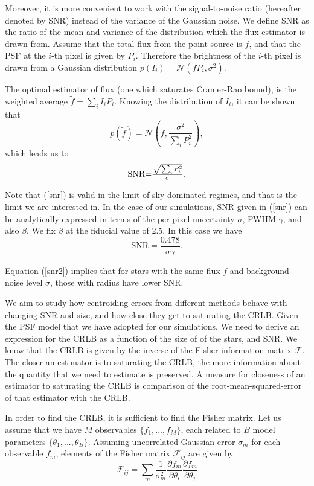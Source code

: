 \documentclass[12pt, preprint]{aastex}
\newcommand{\beq}{\begin{equation}}
\newcommand{\eeq}{\end{equation}}
\begin{document}
Moreover, it is more convenient to work with the signal-to-noise ratio
(hereafter denoted by SNR) instead of the variance of the Gaussian noise.
We define SNR as the ratio of the mean and variance of the distribution
which the flux estimator is drawn from. Assume that the total flux from
the point source is $f$, and that the PSF at the $i$-th pixel is given
by $P_{i}$. Therefore the brightness of the $i$-th pixel is drawn from
a Gaussian distribution $p(I_{i}) = \mathcal{N}(fP_{i},\sigma^{2})$. 

The optimal estimator of flux (one which saturates Cramer-Rao bound),
is the weighted average $\tilde{f}=\sum_{i}I_{i}P_{i}$. Knowing the
distribution of $I_{i}$, it can be shown that 
\beq
p(\tilde{f}) = \mathcal{N}(f , \frac{\sigma^{2}}{\sum_{i}P_{i}^{2}}),
\eeq  
which leads us to
\beq
\begin{array}{l}
\text{SNR} $=$ \frac{\sqrt{\sum_{i} P_{i}^{2}}}{\sigma}.
\end{array}
\label{snr}
\eeq

Note that (\ref{snr}) is valid in the limit of sky-dominated regimes,
and that is the limit we are interested in. In the case of our simulations,
SNR given in (\ref{snr}) can be analytically expressed in terms of the per pixel uncertainty
$\sigma$, FWHM $\gamma$, and also $\beta$. We fix $\beta$ at the fiducial value of 2.5.
In this case we have
\beq
\text{SNR} = \frac{0.478}{\sigma \gamma}.
\label{snr2}
\eeq

Equation (\ref{snr2}) implies that for stars with the same flux $f$ and background
noise level $\sigma$, those with radius have lower SNR.

We aim to study how centroiding errors from different methods behave with
changing SNR and size, and how close they get to saturating the CRLB. 
Given the PSF model that we have adopted for our simulations, We need 
to derive an expression for the CRLB as a function of the size of of
the stars, and SNR. We know that the CRLB is given by the inverse of 
the Fisher information matrix $\mathcal{F}$. The closer an estimator is
to saturating the CRLB, the more information about the quantity that we 
need to estimate is preserved. A measure for closeness of an estimator to 
saturating the CRLB is comparison of the root-mean-squared-error of that estimator 
with the CRLB.

In order to find the CRLB, it is sufficient to find the Fisher matrix.
Let us assume that we have $M$ observables $\{f_{1}, ... , f_{M}\}$, each
related to $B$ model parameters $\{\theta_{1} , ... , \theta_{B}\}$. Assuming
uncorrelated Gaussian error $\sigma_{m}$ for each observable $f_{m}$, elements
of the Fisher matrix $\mathcal{F}_{ij}$ are given by
\beq
\mathcal{F}_{ij} = \sum_{m}\frac{1}{\sigma_{m}^{2}}\frac{\partial f_{m}}{\partial \theta_{i}}\frac{\partial f_{m}}{\partial \theta_{j}}
\label{fisher}
\eeq
\end{document}
